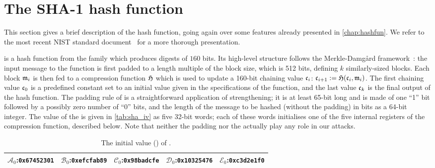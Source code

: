\section{The SHA-1 hash function}
\label{sec:description}

This section gives a brief description of the \shaone hash function, going again over some features already presented in \autoref{chap:hashfun}. We refer to the most recent NIST standard document~\cite{Nist-SHA} for a more thorough
presentation.

\shaone is a hash function from the \mdsha family which produces digests of $160$ bits.
Its high-level structure follows the Merkle-Damg{\aa}rd framework~\cite{DBLP:conf/crypto/Merkle89a,DBLP:conf/crypto/Damgard89a}: the input message to the function
is first padded to a length multiple of the block size, which is 512 bits, defining $k$ similarly-sized blocks.
Each block $\mathfrak{m}_i$ is then fed to a compression function $\operatorname{\mathfrak{H}}$ which is used to update a 160-bit chaining value $\mathfrak{c}_i$:
$\mathfrak{c}_{i+1} := \operatorname{\mathfrak{H}}(\mathfrak{c}_i,\mathfrak{m}_{i})$.
The first chaining value $\mathfrak{c}_0$ is a predefined constant set to an initial value \iv given in the specifications of the function, and the last value $\mathfrak{c}_k$ is the final output of the hash function.
The padding rule of \shaone is a straightforward application of \merkdam strengthening; it is at least 65-bit long and is made of one ``1'' bit followed by a possibly zero
number of ``0'' bits, and the length of the message to be hashed (without the padding) in bits as a 64-bit integer. The value of the \iv is given in \autoref{tab:sha_iv} as five 32-bit words;
each of these words initialises one of the five internal registers of the compression function, described below.
Note that neither the padding nor the \iv actually play any role in our attacks.

\begin{table}[ht]
\caption{\label{tab:sha_iv}The initial value (\iv) of \shaone.}
\begin{center}
\begin{tabular}{c c c c c} \toprule
$\mathcal{A}_0$:\texttt{0x67452301} & $\mathcal{B}_0$:\texttt{0xefcfab89} & $\mathcal{C}_0$:\texttt{0x98badcfe} & $\mathcal{D}_0$:\texttt{0x10325476} & $\mathcal{E}_0$:\texttt{0xc3d2e1f0} \\ 
\bottomrule
\end{tabular}
\end{center}
\end{table}

